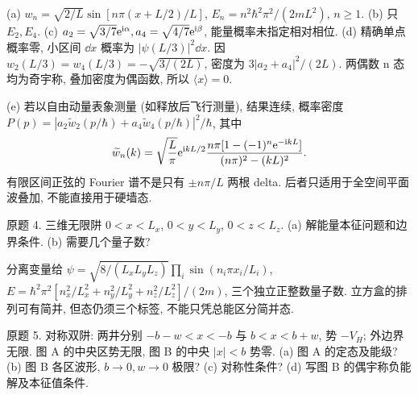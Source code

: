 \begin{solution}
(a) $w_n=\sqrt{2/L}\sin[n\pi(x+L/2)/L]$, $E_n=n^2\hbar^2\pi^2/(2mL^2)$, $n\ge1$. (b) 只 $E_2,E_4$. (c) $a_2=\sqrt{3/7}\mathrm e^{\mathrm i\alpha},a_4=\sqrt{4/7}\mathrm e^{\mathrm i\beta}$, 能量概率未指定相对相位. (d) 精确单点概率零, 小区间 $\dd x$ 概率为 $|\psi(L/3)|^2\dd x$. 因 $w_2(L/3)=w_4(L/3)=-\sqrt{3/(2L)}$, 密度为 $3|a_2+a_4|^2/(2L)$. 两偶数 n 态均为奇宇称, 叠加密度为偶函数, 所以 $\langle x\rangle=0$.

(e) 若以自由动量表象测量 (如释放后飞行测量), 结果连续, 概率密度 $P(p)=|a_2\widetilde w_2(p/\hbar)+a_4\widetilde w_4(p/\hbar)|^2/\hbar$, 其中
\begin{equation}
 \widetilde w_n(k)=\sqrt{\frac L\pi}\mathrm e^{\mathrm i kL/2}
 \frac{n\pi[1-(-1)^n\mathrm e^{-\mathrm i kL}]}{(n\pi)^2-(kL)^2}.
\end{equation}
有限区间正弦的 Fourier 谱不是只有 $\pm n\pi/L$ 两根 delta. 后者只适用于全空间平面波叠加, 不能直接用于硬墙态.
\end{solution}
\begin{exercise}\label{ex:2202-4-4}
原题 4. 三维无限阱 $0<x<L_x$, $0<y<L_y$, $0<z<L_z$. (a) 解能量本征问题和边界条件. (b) 需要几个量子数?
\end{exercise}
\begin{solution}
分离变量给 $\psi=\sqrt{8/(L_xL_yL_z)}\prod_i\sin(n_i\pi x_i/L_i)$,
$E=\hbar^2\pi^2[n_x^2/L_x^2+n_y^2/L_y^2+n_z^2/L_z^2]/(2m)$, 三个独立正整数量子数. 立方盒的排列可有简并, 但态仍须三个标签, 不能只凭总能区分简并态.
\end{solution}
\begin{exercise}\label{ex:2202-4-5}
原题 5. 对称双阱: 两井分别 $-b-w<x<-b$ 与 $b<x<b+w$, 势 $-V_H$; 外边界无限. 图 A 的中央区势无限, 图 B 的中央 $|x|<b$ 势零. (a) 图 A 的定态及能级? (b) 图 B 各区波形, $b\to0,w\to0$ 极限? (c) 对称性条件? (d) 写图 B 的偶宇称负能解及本征值条件.
\end{exercise}
